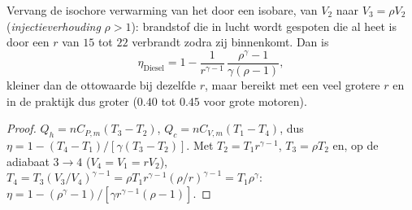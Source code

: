 \begin{proposition}[Dieselkringproces]\label{prop:b1:heat-engines:diesel}
Vervang de isochore verwarming van het  door een isobare, van
$V_2$ naar $V_3 = \rho V_2$ (\emph{injectieverhouding} $\rho > 1$): brandstof die in
lucht wordt gespoten die al heet is door een  $r$ van $15$ tot $22$ verbrandt
zodra zij binnenkomt. Dan is
\[
\eta_{\text{Diesel}} = 1 - \frac{1}{r^{\gamma-1}}\,\frac{\rho^{\gamma} - 1}{\gamma(\rho - 1)} ,
\]
kleiner dan de ottowaarde bij dezelfde $r$, maar bereikt met een veel
grotere $r$ en in de praktijk dus groter ($0.40$ tot $0.45$ voor grote motoren).
\end{proposition}

\begin{proof}
$Q_h = nC_{P,m}(T_3 - T_2)$, $Q_c = nC_{V,m}(T_1 - T_4)$, dus $\eta = 1 -
(T_4 - T_1)/[\gamma(T_3 - T_2)]$. Met $T_2 = T_1r^{\gamma-1}$, $T_3 =
\rho T_2$ en, op de adiabaat $3 \to 4$ ($V_4 = V_1 = rV_2$), $T_4 =
T_3(V_3/V_4)^{\gamma-1} = \rho T_1 r^{\gamma-1}(\rho/r)^{\gamma-1} = T_1\rho^{\gamma}$:
$\eta = 1 - (\rho^\gamma - 1)/[\gamma r^{\gamma-1}(\rho - 1)]$.
\end{proof}

